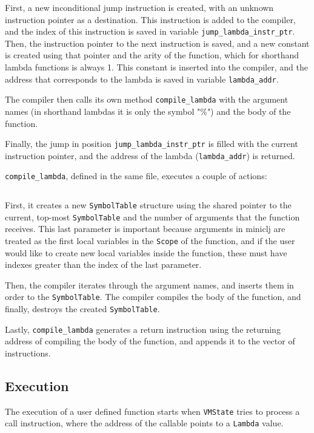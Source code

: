 \documentclass[11pt]{scrreprt}
\begin{document}
\inputminted[firstline=54,lastline=64,breaklines=true]{rust}{/home/mario/git/MarioJim/miniclj/miniclj-lib/src/compiler/state.rs}

First, a new inconditional jump instruction is created, with an unknown instruction pointer as a destination. This instruction is added to the compiler, and the index of this instruction is saved in variable \texttt{jump\_lambda\_instr\_ptr}. Then, the instruction pointer to the next instruction is saved, and a new constant is created using that pointer and the arity of the function, which for shorthand lambda functions is always 1. This constant is inserted into the compiler, and the address that corresponds to the lambda is saved in variable \texttt{lambda\_addr}.

The compiler then calls its own method \texttt{compile\_lambda} with the argument names (in shorthand lambdas it is only the symbol "\%") and the body of the function.

Finally, the jump in position \texttt{jump\_lambda\_instr\_ptr} is filled with the current instruction pointer, and the address of the lambda (\texttt{lambda\_addr}) is returned.

\texttt{compile\_lambda}, defined in the same file, executes a couple of actions:

\inputminted[firstline=86,lastline=105,breaklines=true]{rust}{/home/mario/git/MarioJim/miniclj/miniclj-lib/src/compiler/state.rs}

First, it creates a new \texttt{SymbolTable} structure using the shared pointer to the current, top-most \texttt{SymbolTable} and the number of arguments that the function receives. This last parameter is important because arguments in miniclj are treated as the first local variables in the \texttt{Scope} of the function, and if the user would like to create new local variables inside the function, these must have indexes greater than the index of the last parameter.

Then, the compiler iterates through the argument names, and inserts them in order to the \texttt{SymbolTable}. The compiler compiles the body of the function, and finally, destroys the created \texttt{SymbolTable}.

Lastly, \texttt{compile\_lambda} generates a return instruction using the returning address of compiling the body of the function, and appends it to the vector of instructions.

\subsection{Execution}
The execution of a user defined function starts when \texttt{VMState} tries to process a call instruction, where the address of the callable points to a \texttt{Lambda} value.
\end{document}
